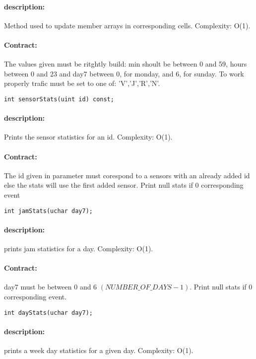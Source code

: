 \documentclass[a4paper, 12pts]{article}
\begin{document}
\paragraph{description:}
	Method used to update member arrays in corresponding cells. Complexity: O(1).
\paragraph{Contract:}
	The values given must be ritghtly build: min shoult be between 0 and 59, hours between 0 and 23 and day7 between 0, for monday, and 6, for sunday. To work properly trafic must be set to one of: 'V','J','R','N'.

\begin{lstlisting}
int sensorStats(uint id) const;
\end{lstlisting}
\paragraph{description:}
	Prints the sensor statistics for an id. Complexity: O(1).
\paragraph{Contract:}
	The id given in parameter must corespond to a sensors with an already added id else the stats will use the first added sensor. Print null stats if 0 corresponding event

\begin{lstlisting}
int jamStats(uchar day7);
\end{lstlisting}
\paragraph{description:}
	prints jam statistics for a day. Complexity: O(1).
\paragraph{Contract:}
	day7 must be between 0 and 6 $(NUMBER\_OF\_DAYS-1)$. Print null stats if 0 corresponding event.
		
\begin{lstlisting}
int dayStats(uchar day7);
\end{lstlisting}
\paragraph{description:}
	prints a week day statistics for a given day. Complexity: O(1).
\end{document}
